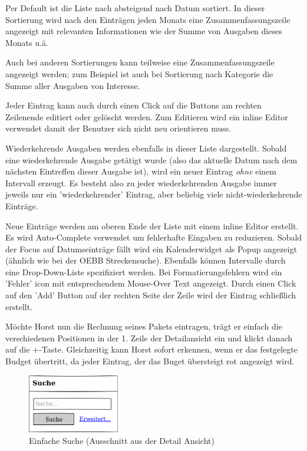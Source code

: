 Per Default ist die Liste nach absteigend nach Datum sortiert. In dieser Sortierung wird nach den
Einträgen jeden Monats eine Zusammenfassungszeile angezeigt mit relevanten Informationen wie der Summe von Ausgaben dieses Monats u.ä.

Auch bei anderen Sortierungen kann teilweise eine Zusammenfassungszeile angezeigt werden; zum Beispiel ist auch 
bei Sortierung nach Kategorie die Summe aller Ausgaben von Interesse.

Jeder Eintrag kann auch durch einen Click auf die Buttons am rechten Zeilenende editiert oder gelöscht werden.
Zum Editieren wird ein inline Editor verwendet damit der Benutzer sich nicht neu orientieren muss.

Wiederkehrende Ausgaben werden ebenfalls in dieser Liste dargestellt. Sobald eine wiederkehrende Ausgabe getätigt wurde
(also das aktuelle Datum nach dem nächsten Eintreffen dieser Ausgabe ist), wird ein neuer Eintrag \emph{ohne} einem Intervall
erzeugt. Es besteht also zu jeder wiederkehrenden Ausgabe immer jeweils nur ein 'wiederkehrender' Eintrag, aber beliebig viele 
nicht-wiederkehrende Einträge.

Neue Einträge werden am oberen Ende der Liste mit einem inline Editor erstellt. Es wird Auto-Complete verwendet um fehlerhafte 
Eingaben zu reduzieren. Sobald der Focus auf Datumseinträge fällt wird ein Kalenderwidget als Popup angezeigt (ähnlich wie bei der
OEBB Streckensuche). Ebenfalls können Intervalle durch eine Drop-Down-Liste spezifiziert werden. Bei Formatierungsfehlern wird ein 'Fehler' icon mit entsprechendem Mouse-Over Text angezeigt. Durch einen Click
auf den 'Add' Button auf der rechten Seite der Zeile wird der Eintrag
schließlich erstellt.

M\"ochte Horst nun die Rechnung seines Pakets eintragen, trägt er einfach die
verschiedenen Positionen in der 1. Zeile der Detailansicht ein und klickt danach
auf die \glqq +\grqq-Taste. Gleichzeitig kann Horst sofort erkennen, wenn er das
festgelegte Budget \"ubertritt, da jeder Eintrag, der das Buget übersteigt
rot angezeigt wird.

\begin{figure}[htl]
\centering
\includegraphics[width=4cm]{img/web_simple_search}
\caption{Einfache Suche (Ausschnitt aus der Detail Ansicht)}
\label{fig:web_simple_search}
\end{figure}

